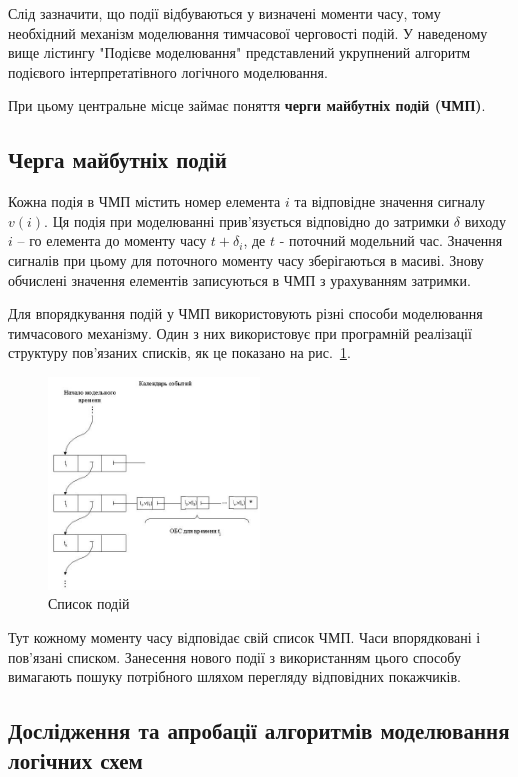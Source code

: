 \documentclass[12pt,a4paper]{article}
\begin{document}
Слід зазначити, що події відбуваються у визначені моменти часу, тому необхідний механізм моделювання тимчасової черговості подій. У наведеному вище лістингу "Подієве моделювання" представлений укрупнений алгоритм подієвого інтерпретатівного логічного моделювання.

При цьому центральне місце займає поняття \textbf{черги майбутніх подій (ЧМП)}.

\subsection{Черга майбутніх подій}

Кожна подія в ЧМП містить номер елемента $i$ та відповідне значення сигналу $v(i)$. Ця подія при моделюванні прив'язується відповідно до затримки $\delta$ виходу $i$ -- го елемента до моменту часу $t+\delta_i$, де $t$ - поточний модельний час. Значення сигналів при цьому для поточного моменту часу зберігаються в масиві. Знову обчислені значення елементів записуються в ЧМП з урахуванням затримки.

Для впорядкування подій у ЧМП використовують різні способи моделювання тимчасового механізму. Один з них використовує при програмній реалізації структуру пов'язаних списків, як це показано на рис.~\ref{feqCalendar}.

\begin{figure}[h]
  \centering
    \includegraphics[width=0.5\textwidth]{05_02.jpg}
  \caption{Список подій}\label{feqCalendar}
\end{figure}

Тут кожному моменту часу відповідає свій список ЧМП. Часи впорядковані і пов'язані списком. Занесення нового події з використанням цього способу вимагають пошуку потрібного шляхом перегляду відповідних покажчиків.

\subsection{Дослідження та апробації алгоритмів моделювання логічних схем}
\end{document}
